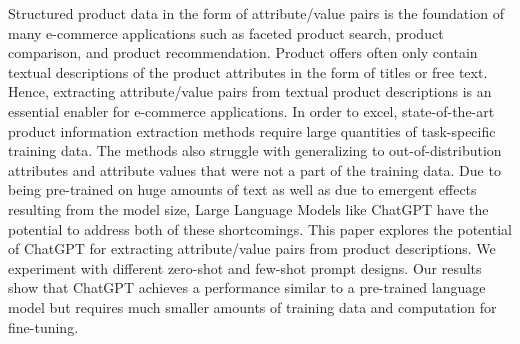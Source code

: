 Structured product data in the form of attribute/value pairs is the foundation of many e-commerce applications such as faceted product search, product comparison, and product recommendation. Product offers often only contain textual descriptions of the product attributes in the form of titles or free text. Hence, extracting attribute/value pairs from textual product descriptions is an essential enabler for e-commerce applications.
In order to excel, state-of-the-art product information extraction methods require large quantities of task-specific training data. The methods also struggle with generalizing to out-of-distribution attributes and attribute values that were not a part of the training data.
 Due to being pre-trained on huge amounts of text as well as due to emergent effects resulting from the model size, Large Language Models like ChatGPT have the potential to address both of these shortcomings. 
This paper explores the potential of ChatGPT for extracting attribute/value pairs from product descriptions. We experiment with different zero-shot and few-shot prompt designs.
Our results show that ChatGPT achieves a performance similar to a pre-trained language model but requires much smaller amounts of training data and computation for fine-tuning.

